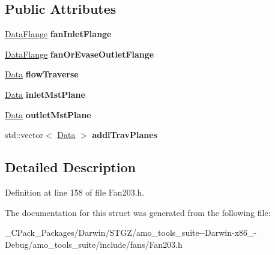 \subsection*{Public Attributes}
\begin{DoxyCompactItemize}
\item 
\mbox{\label{struct_plane_data_1_1_node_binding_1_1_output_a1e03cb2e19c2b0284f75df5cdf065675}} 
\hyperlink{struct_plane_data_1_1_node_binding_1_1_data_flange}{Data\+Flange} {\bfseries fan\+Inlet\+Flange}
\item 
\mbox{\label{struct_plane_data_1_1_node_binding_1_1_output_af07f4acd58bb66b2c9c1b887427d2fbb}} 
\hyperlink{struct_plane_data_1_1_node_binding_1_1_data_flange}{Data\+Flange} {\bfseries fan\+Or\+Evase\+Outlet\+Flange}
\item 
\mbox{\label{struct_plane_data_1_1_node_binding_1_1_output_a5dfaab5fc6ebed9f699191eb3903a97e}} 
\hyperlink{struct_plane_data_1_1_node_binding_1_1_data}{Data} {\bfseries flow\+Traverse}
\item 
\mbox{\label{struct_plane_data_1_1_node_binding_1_1_output_afdb50efd9bba21241d822a10cc8b804c}} 
\hyperlink{struct_plane_data_1_1_node_binding_1_1_data}{Data} {\bfseries inlet\+Mst\+Plane}
\item 
\mbox{\label{struct_plane_data_1_1_node_binding_1_1_output_a7ca28948b57ea956833151a20f446ea1}} 
\hyperlink{struct_plane_data_1_1_node_binding_1_1_data}{Data} {\bfseries outlet\+Mst\+Plane}
\item 
\mbox{\label{struct_plane_data_1_1_node_binding_1_1_output_aee139722930a59d1be944bd1f56365a3}} 
std\+::vector$<$ \hyperlink{struct_plane_data_1_1_node_binding_1_1_data}{Data} $>$ {\bfseries addl\+Trav\+Planes}
\end{DoxyCompactItemize}


\subsection{Detailed Description}


Definition at line 158 of file Fan203.\+h.



The documentation for this struct was generated from the following file\+:\begin{DoxyCompactItemize}
\item 
\+\_\+\+C\+Pack\+\_\+\+Packages/\+Darwin/\+S\+T\+G\+Z/amo\+\_\+tools\+\_\+suite-\/-\/\+Darwin-\/x86\+\_-\/\+Debug/amo\+\_\+tools\+\_\+suite/include/fans/Fan203.\+h\end{DoxyCompactItemize}
